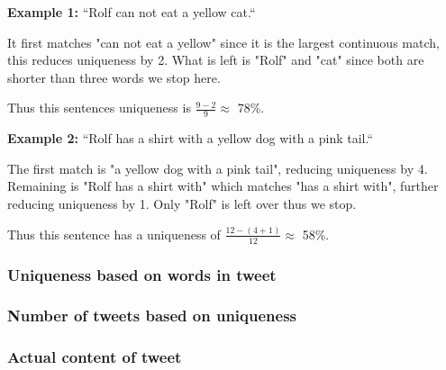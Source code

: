 \documentclass[a4paper,12pt]{article}
\begin{document}
\textbf{Example 1:} ``Rolf can not eat a yellow cat.``
	
It first matches "can not eat a yellow" since it is the largest continuous match, this reduces uniqueness by 2. What is left is "Rolf" and "cat" since both are shorter than three words we stop here.

Thus this sentences uniqueness is $\frac{9 - 2}{9} \approx$ 78\%.

\textbf{Example 2:} ``Rolf has a shirt with a yellow dog with a pink tail.``
	
The first match is "a yellow dog with a pink tail", reducing uniqueness by 4. Remaining is "Rolf has a shirt with" which matches "has a shirt with", further reducing uniqueness by 1. Only "Rolf" is left over thus we stop. 

Thus this sentence has a uniqueness of $\frac{12 - (4 + 1)}{12} \approx$ 58\%.


\subsubsection{Uniqueness based on words in tweet}

\subsubsection{Number of tweets based on uniqueness}

\subsubsection{Actual content of tweet}

\newpage
\end{document}
